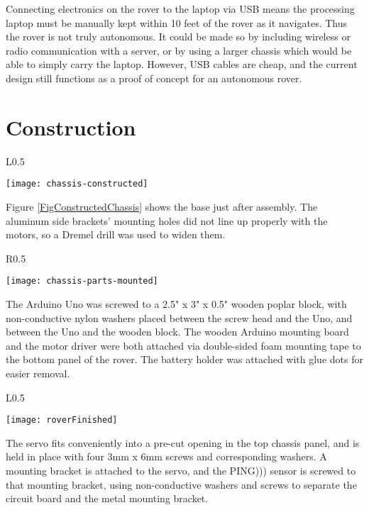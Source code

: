 Connecting electronics on the rover to the laptop via USB means the processing laptop must be manually kept within 10 feet of the rover as it navigates. Thus the rover is not truly autonomous. It could be made so by including wireless or radio communication with a server, or by using a larger chassis which would be able to simply carry the laptop. However, USB cables are cheap, and the current design still functions as a proof of concept for an autonomous rover.

\section{Construction}

\begin{wrapfigure}{L}{0.5\textwidth}
	\caption{Constructed Chassis}
	\centering
	\texttt{[image: chassis-constructed]}
	\label{FigConstructedChassis}
\end{wrapfigure}

Figure \ref{FigConstructedChassis} shows the base just after assembly. The aluminum side brackets' mounting holes did not line up properly with the motors, so a Dremel drill was used to widen them.

\begin{wrapfigure}{R}{0.5\textwidth}
	\caption{Pieces Mounted}
	\centering
	\texttt{[image: chassis-parts-mounted]}
	\label{FigChassisParts}
\end{wrapfigure}

The Arduino Uno was screwed to a 2.5" x 3" x 0.5" wooden poplar block, with non-conductive nylon washers placed between the screw head and the Uno, and between the Uno and the wooden block. The wooden Arduino mounting board and the motor driver were both attached via double-sided foam mounting tape to the bottom panel of the rover. The battery holder was attached with glue dots for easier removal.

\begin{wrapfigure}{L}{0.5\textwidth}
	\caption{Construction Finished}
	\centering
	\texttt{[image: roverFinished]}
	\label{FigRoverFinished}
\end{wrapfigure}

The servo fits conveniently into a pre-cut opening in the top chassis panel, and is held in place with four 3mm x 6mm screws and corresponding washers. A mounting bracket is attached to the servo, and the PING))) sensor is screwed to that mounting bracket, using non-conductive washers and screws to separate the circuit board and the metal mounting bracket.

